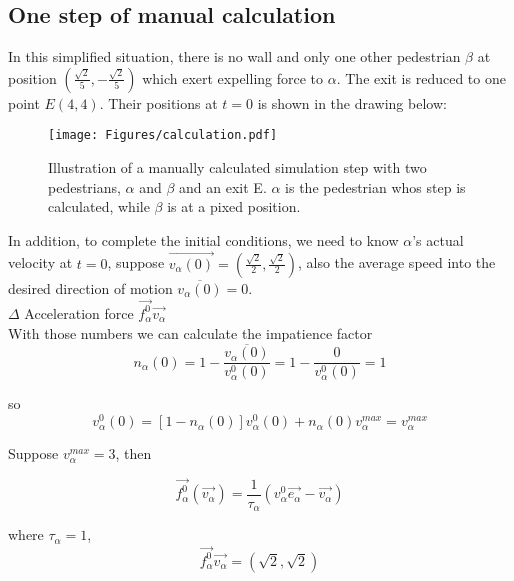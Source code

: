 \subsection{One step of manual calculation}

In this simplified situation, there is no wall and only one other pedestrian $\beta$ at position $(\frac{\sqrt{2}}{5}, -\frac{\sqrt{2}}{5})$ which exert expelling force to $\alpha$.  The exit is reduced to one point $E(4,4)$.  Their positions at $t=0$ is shown in the drawing below:\\

\begin{figure}
\centering
\texttt{[image: Figures/calculation.pdf]}
\caption[Manual calculation]{Illustration of a manually calculated simulation step with two pedestrians, $\alpha$ and $\beta$ and an exit E.
$\alpha$ is the pedestrian whos step is calculated, while $\beta$ is at a pixed position.}
\label{calc}
\end{figure}

In addition, to complete the initial conditions, we need to know $\alpha$'s actual velocity at $t=0$, suppose $\overrightarrow{v_{\alpha}(0)}=(\frac{\sqrt{2}}{2}, \frac{\sqrt{2}}{2})$, also the average speed into the desired direction of motion $\overline{v_{\alpha}(0)}=0$.\\

$\Delta$ Acceleration force  
$\overrightarrow{f^{0}_{\alpha}}\overrightarrow{v_{\alpha}} $\\

With those numbers we can calculate the impatience factor 
 \begin{equation}
 n_{\alpha}(0)=1-\frac{\overline{v_{\alpha}(0)}}{v^{0}_{\alpha}(0)}=1-\dfrac{0}{v^{0}_{\alpha}(0)}=1
 \end{equation}

so 
 \begin{equation}
 v^{0}_{\alpha}(0)=[1-n_{\alpha}(0)]v^{0}_{\alpha}(0) + n_{\alpha}(0)v_{\alpha}^{max} = v_{\alpha}^{max}
 \end{equation}
 
Suppose $v_{\alpha}^{max}=3$, then 

 \begin{equation}
 	\vec{f^{0}_{\alpha}} \left( \vec{v_{\alpha}} \right) 
= 	\frac{1}{\tau_{\alpha}} \left( v^{0}_{\alpha} 
	\vec{e_{\alpha}} - \vec{v_{\alpha}} \right)
 \end{equation}
 
where $\tau_{\alpha}=1$,
 \begin{equation}
 \overrightarrow{f^{0}_{\alpha}}\overrightarrow{v_{\alpha}} = (\sqrt{2}, \sqrt{2})
 \end{equation}

